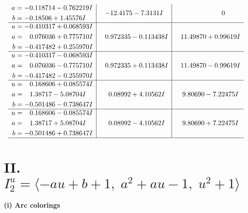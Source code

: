 \documentclass[1p]{elsarticle_modified}
\theoremstyle{definition}
\begin{document}
$$\begin{array}{c|c|c}
\begin{aligned}
a &= -0.118714 - 0.762219 I \\
b &= -0.18506 + 1.45576 I\end{aligned}
 & -12.4175 - 7.3131 I & \phantom{-0.000000 } 0 \\ \hline\begin{aligned}
u &= -0.410317 + 0.068593 I \\
a &= \phantom{-}0.076036 + 0.775710 I \\
b &= -0.417482 + 0.255970 I\end{aligned}
 & \phantom{-}0.972335 - 0.113438 I & \phantom{-}11.49870 + 0.99619 I \\ \hline\begin{aligned}
u &= -0.410317 - 0.068593 I \\
a &= \phantom{-}0.076036 - 0.775710 I \\
b &= -0.417482 - 0.255970 I\end{aligned}
 & \phantom{-}0.972335 + 0.113438 I & \phantom{-}11.49870 - 0.99619 I \\ \hline\begin{aligned}
u &= \phantom{-}0.168606 + 0.085574 I \\
a &= \phantom{-}1.38717 - 5.08704 I \\
b &= -0.501486 - 0.738647 I\end{aligned}
 & \phantom{-}0.08992 + 4.10562 I & \phantom{-}9.80690 - 7.22475 I \\ \hline\begin{aligned}
u &= \phantom{-}0.168606 - 0.085574 I \\
a &= \phantom{-}1.38717 + 5.08704 I \\
b &= -0.501486 + 0.738647 I\end{aligned}
 & \phantom{-}0.08992 - 4.10562 I & \phantom{-}9.80690 + 7.22475 I\\
 \hline 
 \end{array}$$\newpage\newpage\renewcommand{\arraystretch}{1}
\centering \section*{II. $I^u_{2}= \langle - a u+b+1,\;a^2+a u-1,\;u^2+1 \rangle$}
\flushleft \textbf{(i) Arc colorings}\\
\end{document}
